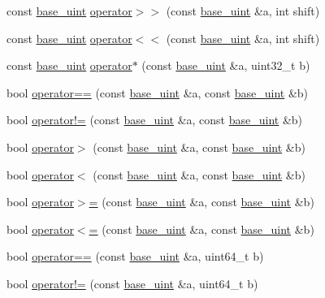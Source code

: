 \begin{DoxyCompactItemize}
\item 
const \hyperlink{classbase__uint}{base\+\_\+uint} \hyperlink{classbase__uint_a9d619adcbf9ad5539f5e98f739edd15d}{operator$>$$>$} (const \hyperlink{classbase__uint}{base\+\_\+uint} \&a, int shift)
\item 
const \hyperlink{classbase__uint}{base\+\_\+uint} \hyperlink{classbase__uint_acee16d973ae59087cd962720773f53dd}{operator$<$$<$} (const \hyperlink{classbase__uint}{base\+\_\+uint} \&a, int shift)
\item 
const \hyperlink{classbase__uint}{base\+\_\+uint} \hyperlink{classbase__uint_a3490f0aef12712d434cda33f913b586f}{operator$\ast$} (const \hyperlink{classbase__uint}{base\+\_\+uint} \&a, uint32\+\_\+t b)
\item 
bool \hyperlink{classbase__uint_aafca305decdfd2ded4688213ab4a55fa}{operator==} (const \hyperlink{classbase__uint}{base\+\_\+uint} \&a, const \hyperlink{classbase__uint}{base\+\_\+uint} \&b)
\item 
bool \hyperlink{classbase__uint_a3cc3bccf252004fbbd2b96dc769378e7}{operator!=} (const \hyperlink{classbase__uint}{base\+\_\+uint} \&a, const \hyperlink{classbase__uint}{base\+\_\+uint} \&b)
\item 
bool \hyperlink{classbase__uint_ac59719bd052d5dc2afcc35ae4a8843ab}{operator$>$} (const \hyperlink{classbase__uint}{base\+\_\+uint} \&a, const \hyperlink{classbase__uint}{base\+\_\+uint} \&b)
\item 
bool \hyperlink{classbase__uint_a89272b5112f90ba683c0f066ba1426c1}{operator$<$} (const \hyperlink{classbase__uint}{base\+\_\+uint} \&a, const \hyperlink{classbase__uint}{base\+\_\+uint} \&b)
\item 
bool \hyperlink{classbase__uint_a9eb243df5a6dfa3d0cd326427d99bfa6}{operator$>$=} (const \hyperlink{classbase__uint}{base\+\_\+uint} \&a, const \hyperlink{classbase__uint}{base\+\_\+uint} \&b)
\item 
bool \hyperlink{classbase__uint_ac7f1bdba7208bd852f7b00f7c49624f8}{operator$<$=} (const \hyperlink{classbase__uint}{base\+\_\+uint} \&a, const \hyperlink{classbase__uint}{base\+\_\+uint} \&b)
\item 
bool \hyperlink{classbase__uint_a977dbbe7e78bbdcc2aea2dc16292d424}{operator==} (const \hyperlink{classbase__uint}{base\+\_\+uint} \&a, uint64\+\_\+t b)
\item 
bool \hyperlink{classbase__uint_ab7b366cc0883f25fa57fb09d4bc33807}{operator!=} (const \hyperlink{classbase__uint}{base\+\_\+uint} \&a, uint64\+\_\+t b)
\end{DoxyCompactItemize}


